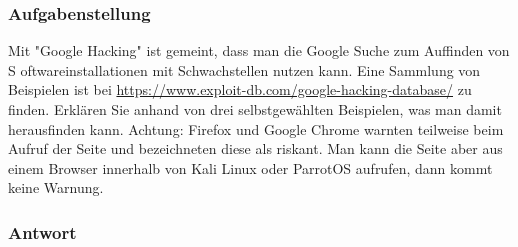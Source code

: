 \documentclass{article}
\begin{document}
\subsubsection*{Aufgabenstellung}

Mit "Google Hacking" ist gemeint, dass man die Google Suche zum Auffinden von S
oftwareinstallationen mit Schwachstellen nutzen kann. Eine Sammlung von Beispielen ist 
bei \url{https://www.exploit-db.com/google-hacking-database/} zu finden. Erklären Sie 
anhand von drei selbstgewählten Beispielen, was man damit herausfinden kann.
Achtung: Firefox und Google Chrome warnten teilweise beim Aufruf der Seite und bezeichneten diese als riskant. Man kann die Seite aber aus einem Browser innerhalb von Kali Linux oder ParrotOS aufrufen, dann kommt keine Warnung.

\subsubsection*{Antwort}
\end{document}
